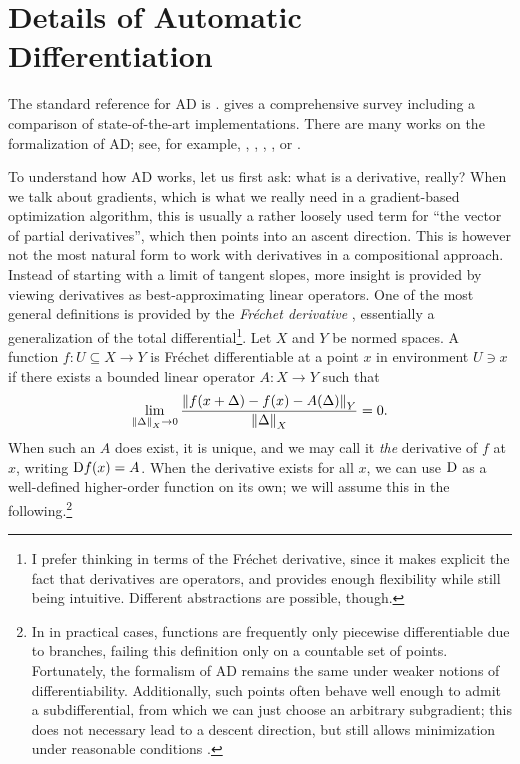 \section{Details of Automatic Differentiation}
\label{sec:ad-details}

The standard reference for AD is \textcite{griewank2008evaluating}.  \textcite{baydin2018automatic}
gives a comprehensive survey including a comparison of state-of-the-art implementations.  There are
many works on the formalization of AD; see, for example, \textcite{abadi2020simple},
\textcite{vytiniotis2019differentiable}, \textcite{wang2019demystifying},
\textcite{sajovic2016operational}, or \textcite{elliott2018simple}.

To understand how AD works, let us first ask: what is a derivative, really?  When we talk about
gradients, which is what we really need in a gradient-based optimization algorithm, this is usually
a rather loosely used term for \enquote{the vector of partial derivatives}, which then points into
an ascent direction.  This is however not the most natural form to work with derivatives in a
compositional approach.  Instead of starting with a limit of tangent slopes, more insight is
provided by viewing derivatives as best-approximating linear operators.  One of the most general
definitions is provided by the \emph{Fréchet derivative}
\parencite[p. 463]{bronstein1995taschenbuch}, essentially a generalization of the total
differential\footnote{I prefer thinking in terms of the Fréchet derivative, since it makes explicit
  the fact that derivatives are operators, and provides enough flexibility while still being
  intuitive.  Different abstractions are possible, though.}.  Let \(X\) and \(Y\) be normed spaces.
A function \(f: U \subseteq X \to Y\) is Fréchet differentiable at a point \(x\) in environment
\(U \ni x\) if there exists a bounded linear operator \(A: X \to Y\) such that
\begin{equation}
  \label{eq:frechet}
  \lim_{\left\lVert\Delta\right\rVert_X \to 0} \frac{\left\lVert f(x + \Delta) - f(x) -
      A(\Delta)\right\rVert_Y}{\left\lVert\Delta\right\rVert_X} = 0.
\end{equation}
When such an \(A\) does exist, it is unique, and we may call it \emph{the} derivative of \(f\) at
\(x\), writing \(\mathop{}\!\mathrm{D} f(x) = A\).  When the derivative exists for all \(x\), we can use \(\mathop{}\!\mathrm{D}\) as
a well-defined higher-order function on its own; we will assume this in the following.\footnote{In
  in practical cases, functions are frequently only piecewise differentiable due to branches,
  failing this definition only on a countable set of points.  Fortunately, the formalism of AD
  remains the same under weaker notions of differentiability.  Additionally, such points often
  behave well enough to admit a subdifferential, from which we can just choose an arbitrary
  subgradient; this does not necessary lead to a descent direction, but still allows minimization
  under reasonable conditions \parencites[see][section 6.1]{pock2017convex}[][chapter
  14]{griewank2008evaluating}{abadi2020simple}.}

